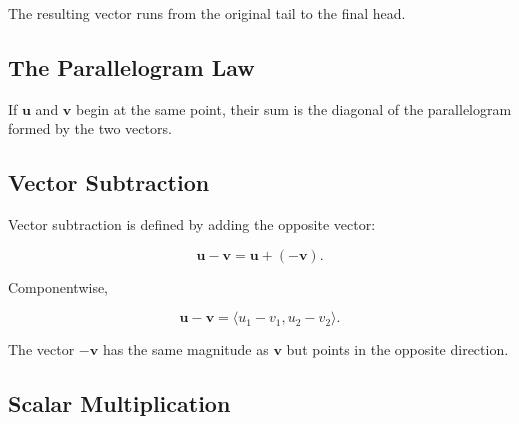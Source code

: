 The resulting vector runs from the original tail to the final head.

\subsection{The Parallelogram Law}
\label{subsec:parallelogram-law-vectors}

If \(\mathbf{u}\) and \(\mathbf{v}\) begin at the same point, their sum is
the diagonal of the parallelogram formed by the two vectors.

\begin{centereddiagram}
\end{centereddiagram}

\subsection{Vector Subtraction}
\label{subsec:vector-subtraction-geometry}

Vector subtraction is defined by adding the opposite vector:

\[ \boxed{\mathbf{u}-\mathbf{v}=\mathbf{u}+(-\mathbf{v}).} \]

Componentwise,

\[
\boxed{
\mathbf{u}-\mathbf{v}
=
\langle
u_1-v_1,
u_2-v_2
\rangle.
}
\]

The vector \(-\mathbf{v}\) has the same magnitude as \(\mathbf{v}\) but
points in the opposite direction.

\subsection{Scalar Multiplication}
\label{subsec:scalar-multiplication-geometry}

